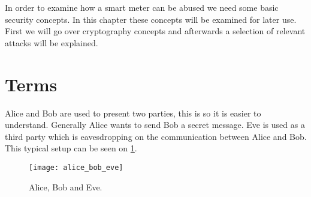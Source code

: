 In order to examine how a smart meter can be abused we need some basic security concepts.
In this chapter these concepts will be examined for later use.
First we will go over cryptography concepts and afterwards a selection of relevant attacks will be explained.

\section{Terms}
Alice and Bob are used to present two parties, this is so it is easier to understand.
Generally Alice wants to send Bob a secret message.
Eve is used as a third party which is eavesdropping on the communication between Alice and Bob.
This typical setup can be seen on \cref{alice_bob_eve}.

\begin{figure}[H]
  \begin{center}
    \texttt{[image: alice\_bob\_eve]}
  \end{center}
  \caption[wat]{Alice, Bob and Eve.\footnotemark}
  \label{alice_bob_eve}
\end{figure}

